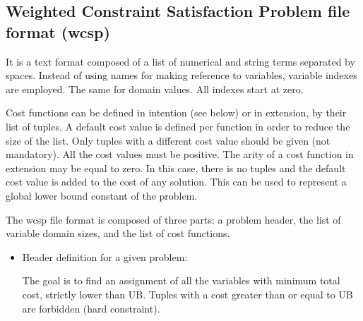 \documentclass[letterpaper,10pt,openany,oneside,english]{sphinxmanual}
\begin{document}
\sphinxstepscope


\subsection{Weighted Constraint Satisfaction Problem file format (wcsp)}
\label{\detokenize{formats/wcspformat:weighted-constraint-satisfaction-problem-file-format-wcsp}}\label{\detokenize{formats/wcspformat:wcsp-format}}\label{\detokenize{formats/wcspformat::doc}}

\begin{fulllineitems}

\pysigstartsignatures
{}
\pysigstopsignatures
\sphinxAtStartPar
It is a text format composed of a list of numerical and string terms separated by spaces. Instead of using names for making reference to variables, variable indexes are employed. The same for domain values. All indexes start at zero.

\sphinxAtStartPar
Cost functions can be defined in intention (see below) or in extension, by their list of tuples. A default cost value is defined per function in order to reduce the size of the list. Only tuples with a different cost value should be given (not mandatory). All the cost values must be positive. The arity of a cost function in extension may be equal to zero. In this case, there is no tuples and the default cost value is added to the cost of any solution. This can be used to represent a global lower bound constant of the problem.

\sphinxAtStartPar
The wcsp file format is composed of three parts: a problem header, the list of variable domain sizes, and the list of cost functions.

\sphinxAtStartPar
\begin{itemize}
\item {} 
\sphinxAtStartPar
Header definition for a given problem: 
\begin{sphinxVerbatim}[commandchars=\\\{\}]
 
   
  
   
       
\end{sphinxVerbatim}
 The goal is to find an assignment of all the variables with minimum total cost, strictly lower than UB. Tuples with a cost greater than or equal to UB are forbidden (hard constraint).


\end{itemize}
\end{fulllineitems}
\end{document}
